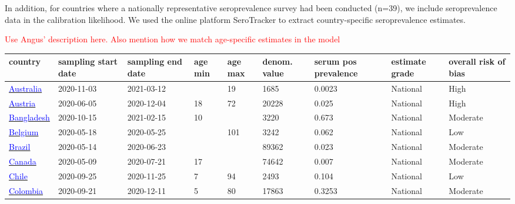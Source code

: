 In addition, for countries where a nationally representative seroprevalence survey had been conducted (n=39), we include
seroprevalence data in the calibration likelihood. We used the online platform SeroTracker to extract country-specific seroprevalence estimates.

\textcolor{red}{Use Angus' description here.}
\textcolor{red}{Also mention how we match age-specific estimates in the model}

\begin{table}[!ht]  
    \footnotesize
    \begin{center}
        \begin{tabular}{p{2cm} | p{1.6cm} | p{1.6cm} | p{0.8cm} | p{0.8cm} | p{1cm} | p{1.3cm} | p{1.2cm} | p{1.2cm}}
           \hline            
           
           \textbf{country} & \textbf{sampling start date} & \textbf{sampling end date} & \textbf{age min} & \textbf{age max} & \textbf{denom. value} & \textbf{serum pos prevalence} & \textbf{estimate grade} & \textbf{overall risk of bias} \\ 
\hline 
\href{https://dx.doi.org/10.5694/mja2.51542}{\textcolor{blue}{Australia}} & 2020-11-03 & 2021-03-12 &  & 19 & 1685 & 0.0023 & National & High \\ 
\hline 
\href{https://dx.doi.org/10.1007/s15010-021-01639-0}{\textcolor{blue}{Austria}} & 2020-06-05 & 2020-12-04 & 18 & 72 & 20228 & 0.025 & National & High \\ 
\hline 
\href{https://dx.doi.org/10.1371/journal.pone.0268093}{\textcolor{blue}{Bangladesh}} & 2020-10-15 & 2021-02-15 & 10 &  & 3220 & 0.673 & National & Moderate \\ 
\hline 
\href{https://dx.doi.org/10.2807/1560-7917.ES.2022.27.9.2100419}{\textcolor{blue}{Belgium}} & 2020-05-18 & 2020-05-25 &  & 101 & 3242 & 0.062 & National & Low \\ 
\hline 
\href{https://www.ncbi.nlm.nih.gov/pmc/articles/PMC8225319/}{\textcolor{blue}{Brazil}} & 2020-05-14 & 2020-06-23 &  &  & 89362 & 0.023 & National & Moderate \\ 
\hline 
\href{http://dx.doi.org/10.1111/trf.16296}{\textcolor{blue}{Canada}} & 2020-05-09 & 2020-07-21 & 17 &  & 74642 & 0.007 & National & Moderate \\ 
\hline 
\href{https://dx.doi.org/10.1186/s12879-022-07045-7}{\textcolor{blue}{Chile}} & 2020-09-25 & 2020-11-25 & 7 & 94 & 2493 & 0.104 & National & Low \\ 
\hline 
\href{https://dx.doi.org/10.1016/j.lana.2022.100195}{\textcolor{blue}{Colombia}} & 2020-09-21 & 2020-12-11 & 5 & 80 & 17863 & 0.3253 & National & Moderate \\ 

\end{tabular}
\end{center}
\end{table}
